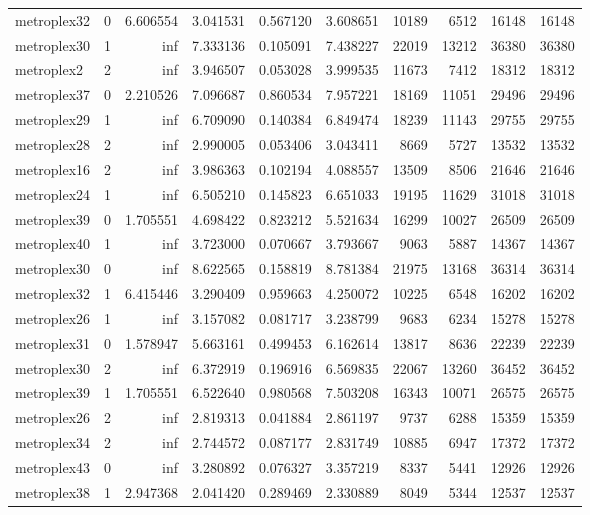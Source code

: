 \begin{longtable}{|l|r|r|r|r|r|r|r|r|r|}
metroplex32 & 0 & 6.606554 & 3.041531 & 0.567120 & 3.608651 & 10189 & 6512 & 16148 & 16148 \\
metroplex30 & 1 & inf & 7.333136 & 0.105091 & 7.438227 & 22019 & 13212 & 36380 & 36380 \\
metroplex2 & 2 & inf & 3.946507 & 0.053028 & 3.999535 & 11673 & 7412 & 18312 & 18312 \\
metroplex37 & 0 & 2.210526 & 7.096687 & 0.860534 & 7.957221 & 18169 & 11051 & 29496 & 29496 \\
metroplex29 & 1 & inf & 6.709090 & 0.140384 & 6.849474 & 18239 & 11143 & 29755 & 29755 \\
metroplex28 & 2 & inf & 2.990005 & 0.053406 & 3.043411 & 8669 & 5727 & 13532 & 13532 \\
metroplex16 & 2 & inf & 3.986363 & 0.102194 & 4.088557 & 13509 & 8506 & 21646 & 21646 \\
metroplex24 & 1 & inf & 6.505210 & 0.145823 & 6.651033 & 19195 & 11629 & 31018 & 31018 \\
metroplex39 & 0 & 1.705551 & 4.698422 & 0.823212 & 5.521634 & 16299 & 10027 & 26509 & 26509 \\
metroplex40 & 1 & inf & 3.723000 & 0.070667 & 3.793667 & 9063 & 5887 & 14367 & 14367 \\
metroplex30 & 0 & inf & 8.622565 & 0.158819 & 8.781384 & 21975 & 13168 & 36314 & 36314 \\
metroplex32 & 1 & 6.415446 & 3.290409 & 0.959663 & 4.250072 & 10225 & 6548 & 16202 & 16202 \\
metroplex26 & 1 & inf & 3.157082 & 0.081717 & 3.238799 & 9683 & 6234 & 15278 & 15278 \\
metroplex31 & 0 & 1.578947 & 5.663161 & 0.499453 & 6.162614 & 13817 & 8636 & 22239 & 22239 \\
metroplex30 & 2 & inf & 6.372919 & 0.196916 & 6.569835 & 22067 & 13260 & 36452 & 36452 \\
metroplex39 & 1 & 1.705551 & 6.522640 & 0.980568 & 7.503208 & 16343 & 10071 & 26575 & 26575 \\
metroplex26 & 2 & inf & 2.819313 & 0.041884 & 2.861197 & 9737 & 6288 & 15359 & 15359 \\
metroplex34 & 2 & inf & 2.744572 & 0.087177 & 2.831749 & 10885 & 6947 & 17372 & 17372 \\
metroplex43 & 0 & inf & 3.280892 & 0.076327 & 3.357219 & 8337 & 5441 & 12926 & 12926 \\
metroplex38 & 1 & 2.947368 & 2.041420 & 0.289469 & 2.330889 & 8049 & 5344 & 12537 & 12537 \\

\end{longtable}
